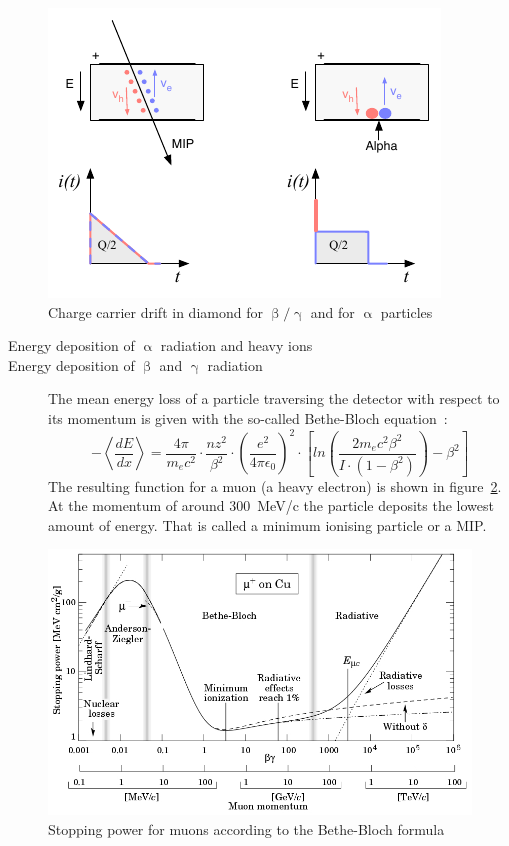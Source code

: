 \documentclass[12pt]{mytustyle}  %
\begin{document}
\begin{figure}[!t]
\begin{center}
\includegraphics[width=0.8\linewidth]{plots/driftboth}
\caption{Charge carrier drift in diamond for $\upbeta/\upgamma$ and for $\upalpha$ particles}
\label{fig:drift}
\end{center}
\end{figure}




\begin{description}
\item[Energy deposition of $\upalpha$ radiation and heavy ions]
\item[Energy deposition of  $\upbeta$ and $\upgamma$ radiation] The mean energy loss of a particle traversing the detector with respect to its momentum is given with the so-called Bethe-Bloch equation~\cite{}: 
\begin{equation}
-\left\langle\frac{dE}{dx}\right\rangle = \frac{4\pi}{m_ec^2}  \cdot \frac{nz^2}{\beta^2}  \cdot  \left(\frac{e^2}{4\pi\epsilon_0}\right)^2  \cdot  \left[ ln \left(\frac{2m_ec^2\beta^2}{I\cdot(1-\beta^2)}\right)-\beta^2  \right]
\label{eq:bethebloch}
\end{equation}
The resulting function for a muon (a heavy electron) is shown in figure~\ref{fig:bb2}. At the momentum of around 300~MeV/c the particle deposits the lowest amount of energy. That is called a minimum ionising particle or a MIP.
\end{description}




\begin{figure}[!t]
\begin{center}
\includegraphics[width=0.7\linewidth]{pics/bb2}
\caption{Stopping power for muons according to the Bethe-Bloch formula~\cite{}}
\label{fig:bb2}
\end{center}
\end{figure}
\end{document}
